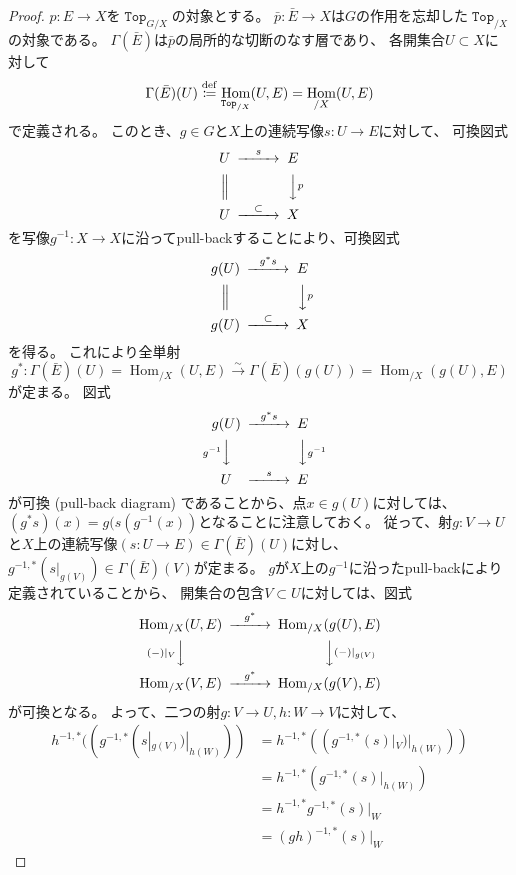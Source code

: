 \documentclass[uplatex]{jsarticle}
\theoremstyle{definition}
\DeclareMathOperator{\Hom}{Hom}
\newcommand{\dfn}{\overset{\mathrm{\tiny def}}{\coloneqq}}
\DeclareMathOperator{\sfTop}{\mathtt{Top}}
\begin{document}
\begin{proof}
  \(p:E\to X\)を\(\sfTop_{G/X}\)の対象とする。
  \(\bar{p}:\bar{E}\to X\)は\(G\)の作用を忘却した\(\sfTop_{/X}\)の対象である。
  \(\Gamma(\bar{E})\)は\(\bar{p}\)の局所的な切断のなす層であり、
  各開集合\(U\subset X\)に対して
  \[
  \Gamma(\bar{E})(U) \dfn \Hom_{\sfTop_{/X}}(U,E) = \Hom_{/X}(U,E)
  \]
  で定義される。
  このとき、\(g\in G\)と\(X\)上の連続写像\(s:U\to E\)に対して、
  可換図式
  \[
  \begin{CD}
    U @>s>> E \\
    @| @VVpV \\
    U @>\subset >> X
  \end{CD}
  \]
  を写像\(g^{-1}:X\to X\)に沿ってpull-backすることにより、可換図式
  \[
  \begin{CD}
    g(U) @>g^*s>> E \\
    @| @VVpV \\
    g(U) @>\subset >> X
  \end{CD}
  \]
  を得る。
  これにより全単射
  \[
  g^*:\Gamma(\bar{E})(U) = \Hom_{/X}(U,E)
  \xrightarrow{\sim} \Gamma(\bar{E})(g(U)) = \Hom_{/X}(g(U),E)
  \]
  が定まる。
  図式
  \[
  \begin{CD}
    g(U) @>g^*s>> E \\
    @Vg^{-1}VV @VVg^{-1}V \\
    U @>s>> E
  \end{CD}
  \]
  が可換 (pull-back diagram) であることから、点\(x\in g(U)\)に対しては、
  \((g^*s)(x) = g(s(g^{-1}(x))\)となることに注意しておく。
  従って、射\(g:V\to U\)と\(X\)上の連続写像\((s:U\to E)\in \Gamma(\bar{E})(U)\)に対し、
  \(g^{-1,*}(s|_{g(V)})\in \Gamma(\bar{E})(V)\)が定まる。
  \(g\)が\(X\)上の\(g^{-1}\)に沿ったpull-backにより定義されていることから、
  開集合の包含\(V\subset U\)に対しては、図式
  \[
  \begin{CD}
    \Hom_{/X}(U,E) @>g^*>> \Hom_{/X}(g(U),E) \\
    @V {(-)|_V} VV @VV {(-)|_{g(V)}} V \\
    \Hom_{/X}(V,E) @>g^*>> \Hom_{/X}(g(V),E)
  \end{CD}
  \]
  が可換となる。
  よって、二つの射\(g:V\to U, h:W\to V\)に対して、
  \begin{align*}
    h^{-1,*}((g^{-1,*}(s|_{g(V)})|_{h(W)}))
    &= h^{-1,*}((g^{-1,*}(s)|_V)|_{h(W)})) \\
    &= h^{-1,*}(g^{-1,*}(s)|_{h(W)}) \\
    &= h^{-1,*}g^{-1,*}(s)|_W \\
    &= (gh)^{-1,*}(s)|_W
  \end{align*}

\end{proof}
\end{document}
